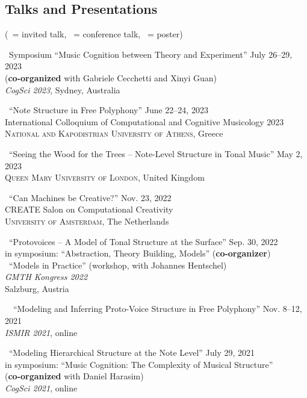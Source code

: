 \documentclass[10pt]{scrartcl}
\newcommand{\margintext}[1]{\marginpar{\raggedleft\small#1}}
\newcommand{\entry}[1]{\vphantom{x}\margintext{#1}}
\begin{document}
\subsection*{Talks and Presentations}

\newcommand{\invited}[0]{\faCommentO\ }
\newcommand{\contrib}[0]{\faCommentsO\ }
\newcommand{\poster}[0]{\faFileO\ }
\newcommand{\talkdate}[1]{\hfill #1}

(\invited = invited talk, \contrib = conference talk, \poster = poster)

\entry{2023}%
\contrib Symposium \enquote{Music Cognition between Theory and Experiment}
\talkdate{July 26--29, 2023}\\
(\textbf{co-organized} with Gabriele Cecchetti and Xinyi Guan)\\
\textit{CogSci 2023}, Sydney, Australia

\poster \enquote{Note Structure in Free Polyphony}
\talkdate{June 22--24, 2023}\\
International Colloquium of Computational and Cognitive Musicology 2023\\
\textsc{National and Kapodistrian University of Athens}, Greece

\invited \enquote{Seeing the Wood for the Trees -- Note-Level Structure in Tonal Music}
\talkdate{May 2, 2023}\\
\textsc{Queen Mary University of London}, United Kingdom

\entry{2022}%
\invited \enquote{Can Machines be Creative?}
\talkdate{Nov. 23, 2022}\\
CREATE Salon on Computational Creativity\\
\textsc{University of Amsterdam}, The Netherlands

\contrib \enquote{Protovoices -- A Model of Tonal Structure at the Surface}
\talkdate{Sep. 30, 2022}\\
in symposium: \enquote{Abstraction, Theory Building, Models} (\textbf{co-organizer})\\
\contrib \enquote{Models in Practice} (workshop, with Johannes Hentschel)\\
\textit{GMTH Kongress 2022}\\
Salzburg, Austria

\entry{2021}%
\contrib \poster \enquote{Modeling and Inferring Proto-Voice Structure in Free Polyphony}
\talkdate{Nov. 8--12, 2021}\\
\textit{ISMIR 2021}, online

\contrib \enquote{Modeling Hierarchical Structure at the Note Level}
\talkdate{July 29, 2021}\\
in symposium: \enquote{Music Cognition: The Complexity of Musical Structure}\\
(\textbf{co-organized} with Daniel Harasim)\\
\textit{CogSci 2021}, online
\end{document}
